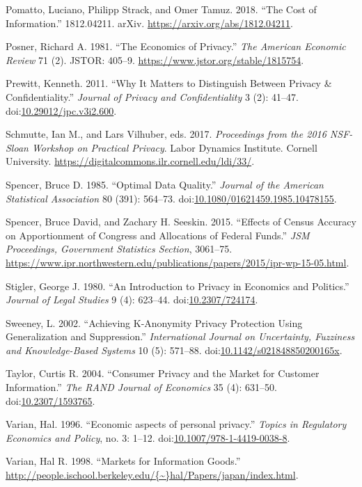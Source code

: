 \documentclass[]{article}
\begin{document}
\hypertarget{ref-PomattoTheCostOfInformation2018}{}
Pomatto, Luciano, Philipp Strack, and Omer Tamuz. 2018. ``The Cost of
Information.'' 1812.04211. arXiv.
\url{https://arxiv.org/abs/1812.04211}.

\hypertarget{ref-posner1981economics}{}
Posner, Richard A. 1981. ``The Economics of Privacy.'' \emph{The
American Economic Review} 71 (2). JSTOR: 405--9.
\url{https://www.jstor.org/stable/1815754}.

\hypertarget{ref-prewitt:2011}{}
Prewitt, Kenneth. 2011. ``Why It Matters to Distinguish Between Privacy
\& Confidentiality.'' \emph{Journal of Privacy and Confidentiality} 3
(2): 41--47.
doi:\href{https://doi.org/10.29012/jpc.v3i2.600}{10.29012/jpc.v3i2.600}.

\hypertarget{ref-Proc:NSF-Sloan:2017}{}
Schmutte, Ian M., and Lars Vilhuber, eds. 2017. \emph{Proceedings from
the 2016 NSF-Sloan Workshop on Practical Privacy}. Labor Dynamics
Institute. Cornell University.
\url{https://digitalcommons.ilr.cornell.edu/ldi/33/}.

\hypertarget{ref-Spencer:Optimal:JASA:1985}{}
Spencer, Bruce D. 1985. ``Optimal Data Quality.'' \emph{Journal of the
American Statistical Association} 80 (391): 564--73.
doi:\href{https://doi.org/10.1080/01621459.1985.10478155}{10.1080/01621459.1985.10478155}.

\hypertarget{ref-Seeskin:Spencer:Effects:2015}{}
Spencer, Bruce David, and Zachary H. Seeskin. 2015. ``Effects of Census
Accuracy on Apportionment of Congress and Allocations of Federal
Funds.'' \emph{JSM Proceedings, Government Statistics Section},
3061--75.
\url{https://www.ipr.northwestern.edu/publications/papers/2015/ipr-wp-15-05.html}.

\hypertarget{ref-stigler1980introduction}{}
Stigler, George J. 1980. ``An Introduction to Privacy in Economics and
Politics.'' \emph{Journal of Legal Studies} 9 (4): 623--44.
doi:\href{https://doi.org/10.2307/724174}{10.2307/724174}.

\hypertarget{ref-sweeney:2002}{}
Sweeney, L. 2002. ``Achieving K-Anonymity Privacy Protection Using
Generalization and Suppression.'' \emph{International Journal on
Uncertainty, Fuzziness and Knowledge-Based Systems} 10 (5): 571--88.
doi:\href{https://doi.org/10.1142/s021848850200165x}{10.1142/s021848850200165x}.

\hypertarget{ref-Taylor:Consumer:RAND:2004}{}
Taylor, Curtis R. 2004. ``Consumer Privacy and the Market for Customer
Information.'' \emph{The RAND Journal of Economics} 35 (4): 631--50.
doi:\href{https://doi.org/10.2307/1593765}{10.2307/1593765}.

\hypertarget{ref-Varian1996}{}
Varian, Hal. 1996. ``Economic aspects of personal privacy.''
\emph{Topics in Regulatory Economics and Policy}, no. 3: 1--12.
doi:\href{https://doi.org/10.1007/978-1-4419-0038-8}{10.1007/978-1-4419-0038-8}.

\hypertarget{ref-Varian1998}{}
Varian, Hal R. 1998. ``Markets for Information Goods.''
\href{http://people.ischool.berkeley.edu/\%7B~\%7Dhal/Papers/japan/index.html}{http://people.ischool.berkeley.edu/\{\textasciitilde{}\}hal/Papers/japan/index.html}.
\end{document}
